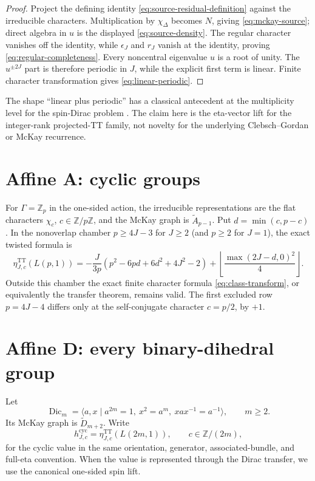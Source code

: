 \documentclass[11pt]{article}
\theoremstyle{definition}
\newcommand{\TT}{\mathrm{TT}}
\newcommand{\Z}{\mathbb Z}
\begin{document}
\begin{proof}
Project the defining identity
\eqref{eq:source-residual-definition} against the irreducible characters.
Multiplication by $\chi_\Delta$ becomes $N$, giving
\eqref{eq:mckay-source}; direct algebra in $u$ is the displayed
\eqref{eq:source-density}.  The regular character vanishes off the identity,
while $\epsilon_J$ and $r_J$ vanish at the identity, proving
\eqref{eq:regular-completeness}.  Every
noncentral eigenvalue $u$ is a root of unity.  The $u^{\pm2J}$ part is
therefore periodic in $J$, while the explicit first term is linear.  Finite
character transformation gives \eqref{eq:linear-periodic}.
\end{proof}

The shape ``linear plus periodic'' has a classical antecedent at the
multiplicity level for the spin-Dirac problem
\cite{CisnerosMolina2001}.  The claim here is the eta-vector lift for the
integer-rank projected-TT family, not novelty for the underlying
Clebsch--Gordan or McKay recurrence.

\section{Affine A: cyclic groups}
\label{sec:A}

For $\Gamma=\Z_p$ in the one-sided action, the irreducible representations
are the flat characters $\chi_c$, $c\in\Z/p\Z$, and the McKay graph is
$\widetilde A_{p-1}$.  Put $d=\min(c,p-c)$.  In the nonoverlap chamber
$p\geq4J-3$ for $J\geq2$ (and $p\geq2$ for $J=1$), the exact twisted formula
is
\begin{equation}
 \boxed{
 \eta^{\TT}_{J,c}(L(p,1))
 =-\frac{J}{3p}
 \left(p^2-6pd+6d^2+4J^2-2\right)
 +\left\lfloor\frac{\max(2J-d,0)^2}{4}\right\rfloor.}
 \label{eq:cyclic-stable}
\end{equation}
Outside this chamber the exact finite character formula
\eqref{eq:class-transform}, or equivalently the transfer theorem, remains
valid.  The first excluded row $p=4J-4$ differs only at the self-conjugate
character $c=p/2$, by $+1$.

\section{Affine D: every binary-dihedral group}
\label{sec:D}

Let
\begin{equation}
 \operatorname{Dic}_m=
 \langle a,x\mid a^{2m}=1,\ x^2=a^m,\ xax^{-1}=a^{-1}\rangle,
 \qquad m\geq2.
 \label{eq:dic-presentation}
\end{equation}
Its McKay graph is $\widetilde D_{m+2}$.  Write
\[
 h^{\mathrm{cyc}}_{J,c}
 =\eta^{\TT}_{J,c}(L(2m,1)),\qquad c\in\Z/(2m),
\]
for the cyclic value in the same orientation, generator, associated-bundle,
and full-eta convention.  When the value is represented through the Dirac
transfer, we use the canonical one-sided spin lift.
\end{document}
